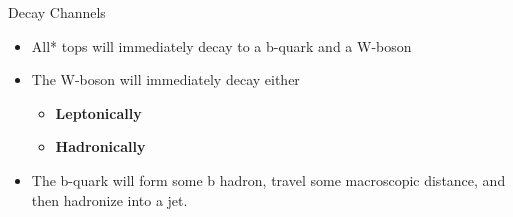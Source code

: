 
\begin{frame}{Decay Channels}
  \begin{minipage}[c][\textheight]{0.45\textwidth}
    \begin{itemize}
      \item<1-> All* tops will immediately decay to a b-quark and a W-boson
      \item<2-> The W-boson will immediately decay either
        \begin{itemize}
          \item<2,4-> \textbf{Leptonically}
          \item<3-> \textbf{Hadronically}
        \end{itemize}
      \item<4-> The b-quark will form some b hadron, travel some macroscopic distance, and then hadronize into a jet.
    \end{itemize}
  \end{minipage}
  \begin{minipage}[c][\textheight]{0.54\textwidth}
    \centering
\end{minipage}
\end{frame}

